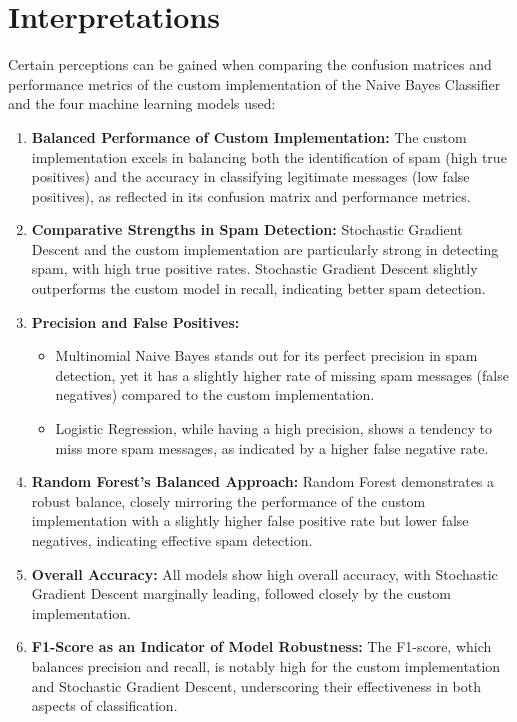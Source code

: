 \documentclass[12pt]{article}
\begin{document}
\section{Interpretations}
Certain perceptions can be gained when comparing the confusion matrices and performance metrics of the custom implementation of the Naive Bayes Classifier and the four machine learning models used:
\begin{enumerate}
\setlength\itemsep{1em}
    \item \textbf{Balanced Performance of Custom Implementation:} The custom implementation excels in balancing both the identification of spam (high true positives) and the accuracy in classifying legitimate messages (low false positives), as reflected in its confusion matrix and performance metrics.

    \item \textbf{Comparative Strengths in Spam Detection:} Stochastic Gradient Descent and the custom implementation are particularly strong in detecting spam, with high true positive rates. Stochastic Gradient Descent slightly outperforms the custom model in recall, indicating better spam detection.

    \item \textbf{Precision and False Positives:}
    \begin{itemize}
        \item Multinomial Naive Bayes stands out for its perfect precision in spam detection, yet it has a slightly higher rate of missing spam messages (false negatives) compared to the custom implementation.
        \item Logistic Regression, while having a high precision, shows a tendency to miss more spam messages, as indicated by a higher false negative rate.
    \end{itemize}

    \item \textbf{Random Forest’s Balanced Approach:} Random Forest demonstrates a robust balance, closely mirroring the performance of the custom implementation with a slightly higher false positive rate but lower false negatives, indicating effective spam detection.

    \item \textbf{Overall Accuracy:} All models show high overall accuracy, with Stochastic Gradient Descent marginally leading, followed closely by the custom implementation.

    \item \textbf{F1-Score as an Indicator of Model Robustness:} The F1-score, which balances precision and recall, is notably high for the custom implementation and Stochastic Gradient Descent, underscoring their effectiveness in both aspects of classification.
\end{enumerate}
\end{document}
